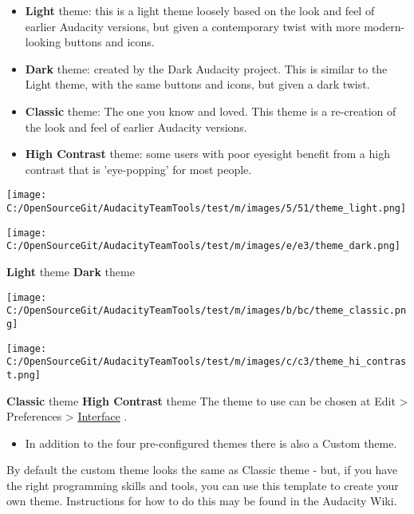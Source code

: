 \begin{multicols}{2}
\begin{itemize}
\item \textbf{Light} theme: this is a light theme loosely based on the look and feel of earlier Audacity versions, but given a contemporary twist with more modern-looking buttons and icons. 
\item \textbf{Dark} theme: created by the Dark Audacity project. This is similar to the Light theme, with the same buttons and icons, but given a dark twist.
\item \textbf{Classic} theme: The one you know and loved. This theme is a re-creation of the look and feel of earlier Audacity versions. 
\item \textbf{High Contrast} theme: some users with poor eyesight benefit from a high contrast that is 'eye-popping' for most people.
\end{itemize}
\par \par \protect\texttt{[image: C:/OpenSourceGit/AudacityTeamTools/test/m/images/5/51/theme\_light.png]}\par \par \protect\texttt{[image: C:/OpenSourceGit/AudacityTeamTools/test/m/images/e/e3/theme\_dark.png]}\par \par \textbf{Light} theme
\textbf{Dark} theme
\par \par \protect\texttt{[image: C:/OpenSourceGit/AudacityTeamTools/test/m/images/b/bc/theme\_classic.png]}\par \par \protect\texttt{[image: C:/OpenSourceGit/AudacityTeamTools/test/m/images/c/c3/theme\_hi\_contrast.png]}\par \par \textbf{Classic} theme
\textbf{High Contrast} theme
The theme to use can be chosen at Edit > Preferences > 
\hyperref[\foo{interface:preferences:}]{Interface}
.  

\begin{itemize}
\item  In addition to the four pre-configured themes there is also a Custom theme.  
\end{itemize}
 By default the custom theme looks the same as Classic theme - but, if you have the right programming skills and tools, you can use this template to create your own theme.  Instructions for how to do this may be found in the Audacity Wiki.

\end{multicols}
